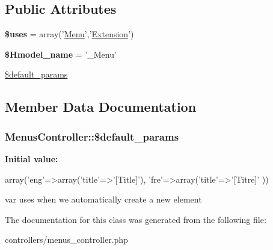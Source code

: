 \subsection*{\-Public \-Attributes}
\begin{DoxyCompactItemize}
\item 
\hypertarget{class_menus_controller_a4b38832a5ebde3abc625fc061b4b8161}{
{\bfseries \$uses} = array('\hyperlink{class_menu}{\-Menu}','\hyperlink{class_extension}{\-Extension}')}
\label{class_menus_controller_a4b38832a5ebde3abc625fc061b4b8161}

\item 
\hypertarget{class_menus_controller_aa757bd6d8c714a3391e2541effdd6f97}{
{\bfseries \$\-Hmodel\-\_\-name} = '\-\_\-\-Menu'}
\label{class_menus_controller_aa757bd6d8c714a3391e2541effdd6f97}

\item 
\hyperlink{class_menus_controller_a21c5a635ffa257bfea3069c4dc3d4ee1}{\$default\-\_\-params}
\end{DoxyCompactItemize}


\subsection{\-Member \-Data \-Documentation}
\hypertarget{class_menus_controller_a21c5a635ffa257bfea3069c4dc3d4ee1}{
\subsubsection[{\$default\-\_\-params}]{\setlength{\rightskip}{0pt plus 5cm}\-Menus\-Controller\-::\$default\-\_\-params}}
\label{class_menus_controller_a21c5a635ffa257bfea3069c4dc3d4ee1}
{\bfseries \-Initial value\-:}
\begin{DoxyCode}
 array('eng'=>array('title'=>'[Title]'),
                                                'fre'=>array('title'=>'[Titre]'
      ))
\end{DoxyCode}
var uses when we automatically create a new element 

\-The documentation for this class was generated from the following file\-:\begin{DoxyCompactItemize}
\item 
controllers/menus\-\_\-controller.\-php\end{DoxyCompactItemize}
